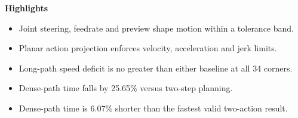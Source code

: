 \documentclass[10pt,a4paper]{article}
\begin{document}
{\large\bfseries Highlights}\par\begin{itemize}[leftmargin=1.5em,itemsep=10pt]
\item Joint steering, feedrate and preview shape motion within a tolerance band.
\item Planar action projection enforces velocity, acceleration and jerk limits.
\item Long-path speed deficit is no greater than either baseline at all 34 corners.
\item Dense-path time falls by 25.65\% versus two-step planning.
\item Dense-path time is 6.07\% shorter than the fastest valid two-action result.
\end{itemize}
\end{document}
